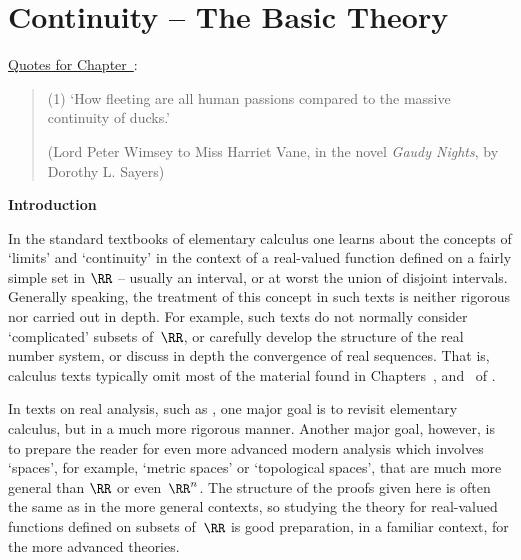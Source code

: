 
%
%

                  \chapter{Continuity -- The Basic Theory}
                  \label{ChaptD}

\VV


        \underline{Quotes for Chapter~}:

\V

\begin{quotation}
{\footnotesize
        (1) `How fleeting are all human passions compared to the massive continuity of ducks.'

        (Lord Peter Wimsey to Miss Harriet Vane, in the novel {\em Gaudy Nights}, by Dorothy L. Sayers)

\V

}%
\end{quotation}


            \small{\bf Introduction}

\V

        In the standard textbooks of elementary calculus one learns about the concepts of `limits' and `continuity'
    in the context of a real-valued function defined on a fairly simple set in ${\RR}$ -- usually an interval, or at worst the union of disjoint intervals.
    Generally speaking, the treatment of this concept in such texts is neither rigorous nor carried out in depth. For example, such texts do not normally consider
    `complicated' subsets of~${\RR}$, or carefully develop the structure of the real number system, or discuss in depth the convergence of real sequences.
    That is, calculus texts typically omit most of the material found in Chapters~,  and~ of {\ThisText}.

        In texts on real analysis, such as {\ThisText}, one major goal is to revisit elementary calculus, but in a much more rigorous manner.
    Another major goal, however, is to prepare the reader for even more advanced modern analysis which involves `spaces', for example, `metric spaces' or `topological spaces',
    that are much more general than ${\RR}$ or even~${\RR}^{n}$. The structure of the proofs given here is often the same as in the more general contexts,
    so studying the theory for real-valued functions defined on subsets of~${\RR}$ is good preparation, in a familiar context, for the more advanced theories.

